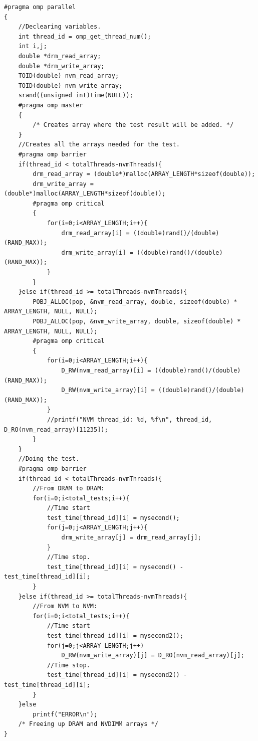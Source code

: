 \documentclass[12pt,a4paper,USenglish]{article}      %
\begin{document}
\begin{lstlisting}[caption={NVM-NVM source code.},escapeinside={{/*!}{!*/}}, label={lst:NVMNVMcode}]
#pragma omp parallel
{
	//Declearing variables.
	int thread_id = omp_get_thread_num();
	int i,j;
	double *drm_read_array;
	double *drm_write_array;
	TOID(double) nvm_read_array;
	TOID(double) nvm_write_array;
	srand((unsigned int)time(NULL));	
	#pragma omp master
	{
		/* Creates array where the test result will be added. */
	}	
	//Creates all the arrays needed for the test.
	#pragma omp barrier
	if(thread_id < totalThreads-nvmThreads){
		drm_read_array = (double*)malloc(ARRAY_LENGTH*sizeof(double));
        drm_write_array = (double*)malloc(ARRAY_LENGTH*sizeof(double));
		#pragma omp critical
		{
			for(i=0;i<ARRAY_LENGTH;i++){
				drm_read_array[i] = ((double)rand()/(double)(RAND_MAX));
				drm_write_array[i] = ((double)rand()/(double)(RAND_MAX));
			}
		}
	}else if(thread_id >= totalThreads-nvmThreads){
		POBJ_ALLOC(pop, &nvm_read_array, double, sizeof(double) * ARRAY_LENGTH, NULL, NULL);
		POBJ_ALLOC(pop, &nvm_write_array, double, sizeof(double) * ARRAY_LENGTH, NULL, NULL);
		#pragma omp critical
		{
			for(i=0;i<ARRAY_LENGTH;i++){
				D_RW(nvm_read_array)[i] = ((double)rand()/(double)(RAND_MAX));
				D_RW(nvm_write_array)[i] = ((double)rand()/(double)(RAND_MAX));
			}
			//printf("NVM thread_id: %d, %f\n", thread_id, D_RO(nvm_read_array)[11235]);
		}
	}
	//Doing the test.
	#pragma omp barrier
	if(thread_id < totalThreads-nvmThreads){
		//From DRAM to DRAM:
		for(i=0;i<total_tests;i++){
			//Time start
			test_time[thread_id][i] = mysecond();
			for(j=0;j<ARRAY_LENGTH;j++){
				drm_write_array[j] = drm_read_array[j];
			}
			//Time stop.
			test_time[thread_id][i] = mysecond() - test_time[thread_id][i];
		}
	}else if(thread_id >= totalThreads-nvmThreads){
		//From NVM to NVM:
		for(i=0;i<total_tests;i++){
			//Time start
			test_time[thread_id][i] = mysecond2();
			for(j=0;j<ARRAY_LENGTH;j++)
				D_RW(nvm_write_array)[j] = D_RO(nvm_read_array)[j];
			//Time stop.
			test_time[thread_id][i] = mysecond2() - test_time[thread_id][i];
		}
	}else
		printf("ERROR\n");
	/* Freeing up DRAM and NVDIMM arrays */
}
\end{lstlisting}
\end{document}
